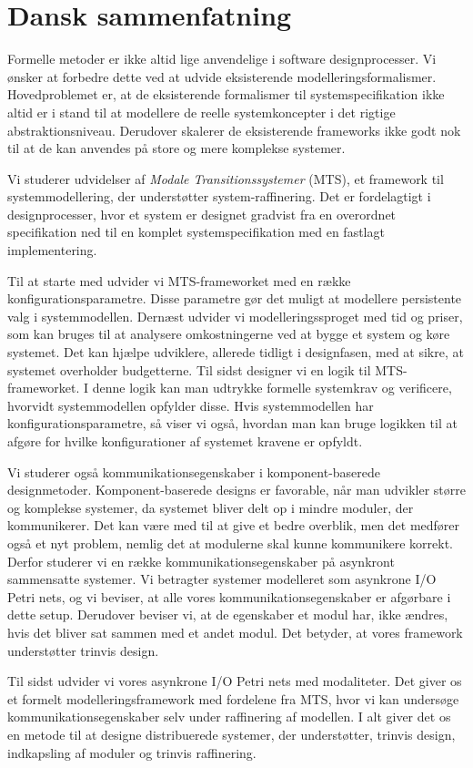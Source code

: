 \chapter*{Dansk sammenfatning}
Formelle metoder er ikke altid lige anvendelige i software designprocesser. Vi {\o}nsker at forbedre dette ved at udvide eksisterende modelleringsformalismer. Hovedproblemet er, at de eksisterende formalismer til systemspecifikation ikke altid er i stand til at modellere de reelle systemkoncepter i det rigtige abstraktionsniveau. Derudover skalerer de eksisterende frameworks ikke godt nok til at de kan anvendes p{\aa} store og mere komplekse systemer.

Vi studerer udvidelser af \emph{Modale Transitionssystemer} (MTS), et framework til systemmodellering, der underst{\o}tter system-raffinering. Det er fordelagtigt i designprocesser, hvor et system er designet gradvist fra en overordnet specifikation ned til en komplet systemspecifikation med en fastlagt implementering.

Til at starte med udvider vi MTS-frameworket med en r{\ae}kke konfigurationsparametre. Disse parametre g{\o}r det muligt at modellere persistente valg i systemmodellen.
Dern{\ae}st udvider vi modelleringssproget med tid og priser, som kan bruges til at analysere omkostningerne ved at bygge et system og k{\o}re systemet. Det kan hj{\ae}lpe udviklere, allerede tidligt i designfasen, med at sikre, at systemet overholder budgetterne. Til sidst designer vi en logik til MTS-frameworket. I denne logik kan man udtrykke formelle systemkrav og verificere, hvorvidt systemmodellen opfylder disse. Hvis systemmodellen har konfigurationsparametre, s{\aa} viser vi ogs{\aa}, hvordan man kan bruge logikken til at afg{\o}re for hvilke konfigurationer af systemet kravene er opfyldt.

Vi studerer ogs{\aa} kommunikationsegenskaber i komponent-baserede designmetoder. Komponent-baserede designs er favorable, n{\aa}r man udvikler st{\o}rre og komplekse systemer, da systemet bliver delt op i mindre moduler, der kommunikerer. Det kan v{\ae}re med til at give et bedre overblik, men det medf{\o}rer ogs{\aa} et nyt problem, nemlig det at modulerne skal kunne kommunikere korrekt. Derfor studerer vi en r{\ae}kke kommunikationsegenskaber p{\aa} asynkront sammensatte systemer. Vi betragter systemer modelleret som asynkrone I/O Petri nets, og vi beviser, at alle vores kommunikationsegenskaber er afg{\o}rbare i dette setup. Derudover beviser vi, at de egenskaber et modul har, ikke {\ae}ndres, hvis det bliver sat sammen med et andet modul. Det betyder, at vores framework underst{\o}tter trinvis design.

Til sidst udvider vi vores asynkrone I/O Petri nets med modaliteter. Det giver os et formelt modelleringsframework med fordelene fra MTS, hvor vi kan unders{\o}ge kommunikationsegenskaber selv under raffinering af modellen. I alt giver det os en metode til at designe distribuerede systemer, der underst{\o}tter, trinvis design, indkapsling af moduler og trinvis raffinering.